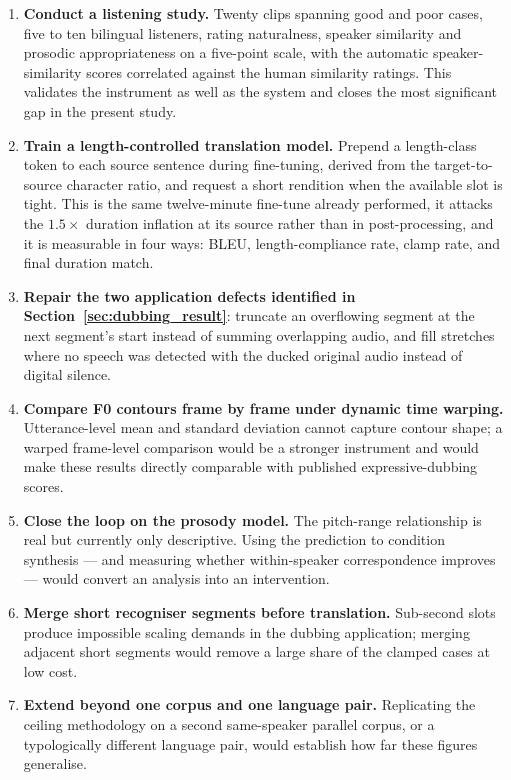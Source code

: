 \begin{enumerate}
  \item \textbf{Conduct a listening study.} Twenty clips spanning good and poor cases, five to ten
        bilingual listeners, rating naturalness, speaker similarity and prosodic appropriateness on
        a five-point scale, with the automatic speaker-similarity scores correlated against the
        human similarity ratings. This validates the instrument as well as the system and closes
        the most significant gap in the present study.
  \item \textbf{Train a length-controlled translation model.} Prepend a length-class token to each
        source sentence during fine-tuning, derived from the target-to-source character ratio, and
        request a short rendition when the available slot is tight. This is the same twelve-minute
        fine-tune already performed, it attacks the $1.5\times$ duration inflation at its source
        rather than in post-processing, and it is measurable in four ways: BLEU,
        length-compliance rate, clamp rate, and final duration match.
  \item \textbf{Repair the two application defects identified in
        Section~\ref{sec:dubbing_result}}: truncate an overflowing segment at the next segment's
        start instead of summing overlapping audio, and fill stretches where no speech was detected
        with the ducked original audio instead of digital silence.
  \item \textbf{Compare F0 contours frame by frame under dynamic time warping.} Utterance-level
        mean and standard deviation cannot capture contour shape; a warped frame-level comparison
        would be a stronger instrument and would make these results directly comparable with
        published expressive-dubbing scores.
  \item \textbf{Close the loop on the prosody model.} The pitch-range relationship is real but
        currently only descriptive. Using the prediction to condition synthesis --- and measuring
        whether within-speaker correspondence improves --- would convert an analysis into an
        intervention.
  \item \textbf{Merge short recogniser segments before translation.} Sub-second slots produce
        impossible scaling demands in the dubbing application; merging adjacent short segments
        would remove a large share of the clamped cases at low cost.
  \item \textbf{Extend beyond one corpus and one language pair.} Replicating the ceiling
        methodology on a second same-speaker parallel corpus, or a typologically different language
        pair, would establish how far these figures generalise.
\end{enumerate}

